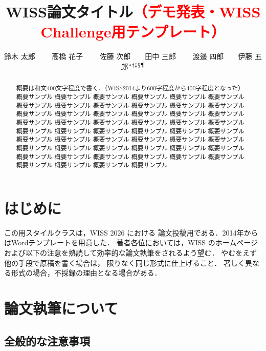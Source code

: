 \documentclass[twoside]{wiss}
\begin{document}
\title{WISS論文タイトル\textcolor{red}{（デモ発表・WISS Challenge用テンプレート）}}
\etitle{}%
%
%
%
\author{鈴木 太郎 　　高橋 花子
　　佐藤 次郎　　田中 三郎
　　渡邊 四郎　　伊藤 五郎${}^* {}^\dag {}^\ddag {}^\mathsection
{}^\mathparagraph$}

\begin{abstract}
概要は和文400文字程度で書く．（WISS2014より600字程度から400字程度となった）
概要サンプル 概要サンプル 概要サンプル 概要サンプル 概要サンプル 概要サンプル
概要サンプル 概要サンプル 概要サンプル 概要サンプル 概要サンプル 概要サンプル
概要サンプル 概要サンプル 概要サンプル 概要サンプル 概要サンプル 概要サンプル
概要サンプル 概要サンプル 概要サンプル 概要サンプル 概要サンプル 概要サンプル
概要サンプル 概要サンプル 概要サンプル 概要サンプル 概要サンプル 概要サンプル
概要サンプル 概要サンプル 概要サンプル 概要サンプル 概要サンプル 概要サンプル
概要サンプル 概要サンプル 概要サンプル 概要サンプル 概要サンプル 概要サンプル
概要サンプル 概要サンプル 概要サンプル 概要サンプル 概要サンプル 概要サンプル
概要サンプル 概要サンプル 概要サンプル 概要サンプル
\end{abstract}

\maketitle

\section{はじめに}

この\LaTeXe{}用スタイルクラスは，WISS 2026 における
論文投稿用である．2014年からはWordテンプレートを用意した．
著者各位においては，WISS のホームページ\cite{wiss}
および以下の注意を熟読して効率的な論文執筆をされるよう望む．
やむをえず他の手段で原稿を書く場合は，
限りなく同じ形式に仕上げること．
著しく異なる形式の場合，不採録の理由となる場合がある．

\section{論文執筆について}

\subsection{全般的な注意事項}
\end{document}
